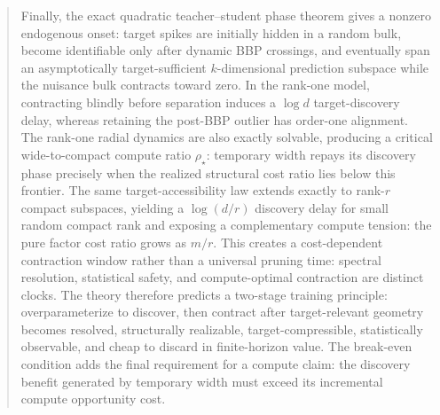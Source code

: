 \documentclass[11pt]{article}
\theoremstyle{definition}
\begin{document}
\begin{abstract}
Finally, the exact quadratic teacher--student phase theorem gives a nonzero endogenous onset: target spikes are initially hidden in a random bulk, become identifiable only after dynamic BBP crossings, and eventually span an asymptotically target-sufficient $k$-dimensional prediction subspace while the nuisance bulk contracts toward zero. In the rank-one model, contracting blindly before separation induces a $\log d$ target-discovery delay, whereas retaining the post-BBP outlier has order-one alignment. The rank-one radial dynamics are also exactly solvable, producing a critical wide-to-compact compute ratio $\rho_\star$: temporary width repays its discovery phase precisely when the realized structural cost ratio lies below this frontier. The same target-accessibility law extends exactly to rank-$r$ compact subspaces, yielding a $\log(d/r)$ discovery delay for small random compact rank and exposing a complementary compute tension: the pure factor cost ratio grows as $m/r$. This creates a cost-dependent contraction window rather than a universal pruning time: spectral resolution, statistical safety, and compute-optimal contraction are distinct clocks. The theory therefore predicts a two-stage training principle: overparameterize to discover, then contract after target-relevant geometry becomes resolved, structurally realizable, target-compressible, statistically observable, and cheap to discard in finite-horizon value. The break-even condition adds the final requirement for a compute claim: the discovery benefit generated by temporary width must exceed its incremental compute opportunity cost.
\end{abstract}

















\end{document}
